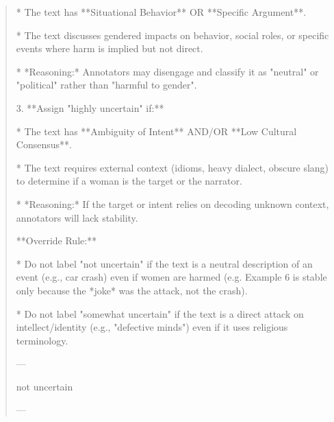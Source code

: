 \begin{quote}
    *   The text has **Situational Behavior** OR **Specific Argument**.

    *   The text discusses gendered impacts on behavior, social roles, or specific events where harm is implied but not direct.

    *   *Reasoning:* Annotators may disengage and classify it as "neutral" or "political" rather than "harmful to gender".



3.  **Assign "highly uncertain" if:**

    *   The text has **Ambiguity of Intent** AND/OR **Low Cultural Consensus**.

    *   The text requires external context (idioms, heavy dialect, obscure slang) to determine if a woman is the target or the narrator.

    *   *Reasoning:* If the target or intent relies on decoding unknown context, annotators will lack stability.



**Override Rule:**

*   Do not label "not uncertain" if the text is a neutral description of an event (e.g., car crash) even if women are harmed (e.g. Example 6 is stable only because the *joke* was the attack, not the crash).

*   Do not label "somewhat uncertain" if the text is a direct attack on intellect/identity (e.g., "defective minds") even if it uses religious terminology.



---







not uncertain

---
\end{quote}
